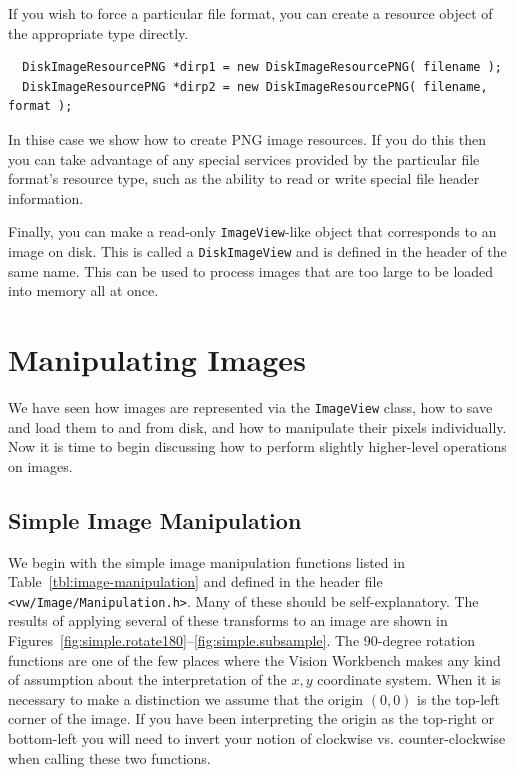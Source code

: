 If you wish to force a particular file format, you can create a resource 
object of the appropriate type directly.
\begin{verbatim}
  DiskImageResourcePNG *dirp1 = new DiskImageResourcePNG( filename );
  DiskImageResourcePNG *dirp2 = new DiskImageResourcePNG( filename, format );
\end{verbatim}
In thise case we show how to create PNG image resources.  If you do this 
then you can take advantage of any special services provided by the 
particular file format's resource type, such as the ability to read or 
write special file header information.

Finally, you can make a read-only \verb#ImageView#-like object that 
corresponds to an image on disk.  This is called a \verb#DiskImageView# 
and is defined in the header of the same name.  This can be used to 
process images that are too large to be loaded into memory all at once. 

\section{Manipulating Images}

We have seen how images are represented via the \verb#ImageView#
class, how to save and load them to and from disk, and how to
manipulate their pixels individually.  Now it is time to begin 
discussing how to perform slightly higher-level operations on images.

\subsection{Simple Image Manipulation}

We begin with the simple image manipulation functions listed in
Table~\ref{tbl:image-manipulation} and defined in the header file
\verb#<vw/Image/Manipulation.h>#.  Many of these should be
self-explanatory.  The results of applying several of these transforms
to an image are shown in
Figures~\ref{fig:simple.rotate180}--\ref{fig:simple.subsample}.  The
90-degree rotation functions are one of the few places where the
Vision Workbench makes any kind of assumption about the interpretation
of the $x,y$ coordinate system.  When it is necessary to make a
distinction we assume that the origin $(0,0)$ is the top-left corner
of the image.  If you have been interpreting the origin as the
top-right or bottom-left you will need to invert your notion of
clockwise vs. counter-clockwise when calling these two functions.

